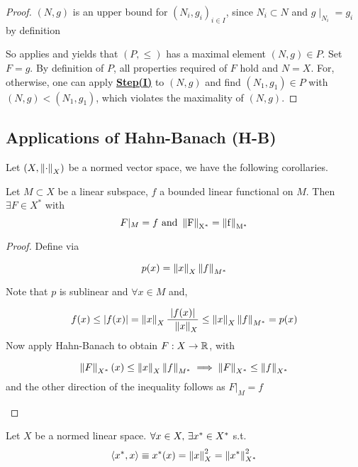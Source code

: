 \documentclass{article}
\begin{document}
\begin{proof}
$(N,g)$ is an upper bound for $(N_i, g_i)_{i \in I}$, since $N_i \subset N$ and $g\mid_{N_i} = g_i$ by definition  

So  applies and yields that $(P, \leq)$ has a maximal element $(N,g)\in P$. Set $F=g$.  
By definition of $P$, all properties required of $F$ hold and $N=X$. For, otherwise, one can apply \underline{\textbf{Step(I)}} to $(N,g)$ and find $(N_1, g_1) \in P$ with $(N,g) < (N_1, g_1)$, which violates the maximality of $(N,g)$.
\end{proof}


\begin{remark}

\end{remark}  

\subsection{Applications of Hahn-Banach (H-B)}  

Let $(X, \left\|{\cdot}\right\|_X)$ be a normed vector space, we have the following corollaries.  

\begin{corollary}
\label{same norm extension}
Let $M \subset X$ be a linear subspace, $f$ a bounded linear functional on $M$. Then $\exists F \in X^*$ with 
$$F |_M = f \ \rm{and} \ \norm{F}_{X^*}=\norm{f}_{M^*}$$
\end{corollary}

\begin{proof}
Define  via  

$$p(x) = \left\|{x}\right\|_X \left\|{f}\right\|_{M^*}$$  

Note that $p$ is sublinear and $\forall x \in M$ and,  

$$f(x) \leq |f(x)|=\left\|{x}\right\|_X \frac{|f(x)|}{\hphantom{x} \left\|{x}\right\|_X} \leq \left\|{x}\right\|_X \left\|{f}\right\|_{M^*}=p(x)$$  
Now apply Hahn-Banach to obtain $F: X \to \mathbb{R}$, with  
\begin{unexaminable}
$$\left\|{F}\right\|_{X^*}(x) \leq \left\|{x}\right\|_X \left\|{f}\right\|_{M^*} \implies \left\|{F}\right\|_{X^*} \leq \left\|{f}\right\|_{X^*}$$
and the other direction of the inequality follows as $F |_M = f$
\end{unexaminable}
\end{proof}  

\begin{theorem}
\label{existence of functional equals norm squared}
	Let $X$ be a normed linear space. $\forall x\in X,\,\exists x^*\in {X}^*$ s.t. $$\left<{{x}^*},{x}\right>\equiv{x}^*(x)=\left\|{x}\right\|^2_X=\left\|{{x}^*}\right\|^2_{{X}^*}$$
\end{theorem}
\end{document}
